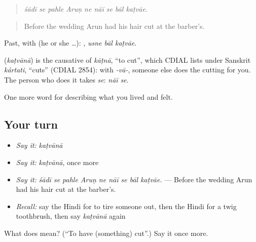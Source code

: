 \begin{quote}
        
\end{quote}

\begin{quote}
\emph{śādī se pahle Aruṇ ne nāī se bāl kaṭvāe.}
\end{quote}

\begin{quote}
Before the wedding Arun had his hair cut at the barber's.
\end{quote}

Past, with  (he or she …):   , \emph{usne bāl kaṭvāe}.

\begin{cousinweb}
\textbf{} (\emph{kaṭvānā}) is the causative of \emph{kāṭnā}, \textquotedblleft{}to cut\textquotedblright{}, which CDIAL lists under Sanskrit \emph{kártati}, \textquotedblleft{}cuts\textquotedblright{} (CDIAL 2854): with \emph{-vā-}, someone else does the cutting for you. The person who does it takes \emph{se}: \emph{nāī se}.
\end{cousinweb}

\begin{grammarlens}[title={What you've built}]
One more word for describing what you lived and felt.
\end{grammarlens}

\subsection*{Your turn}
\begin{itemize}
\raggedright
  \item \emph{Say it:} \emph{kaṭvānā}
  \item \emph{Say it:} \emph{kaṭvānā}, once more
  \item \emph{Say it:} \emph{śādī se pahle Aruṇ ne nāī se bāl kaṭvāe.} — Before the wedding Arun had his hair cut at the barber's.
  \item \emph{Recall:} say the Hindi for to tire someone out, then the Hindi for a twig toothbrush, then say \emph{kaṭvānā} again
\end{itemize}

\begin{tcolorbox}[breakable,colback=teal!4,colframe=teal!35!black,title={Before you move on}]
What does  mean? (\textquotedblleft{}To have (something) cut\textquotedblright{}.) Say it once more.
\end{tcolorbox}
